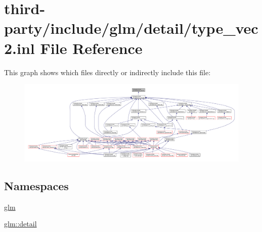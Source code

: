 \hypertarget{type__vec2_8inl}{}\section{third-\/party/include/glm/detail/type\+\_\+vec2.inl File Reference}
\label{type__vec2_8inl}
This graph shows which files directly or indirectly include this file\+:
\nopagebreak
\begin{figure}[H]
\begin{center}
\leavevmode
\includegraphics[width=350pt]{type__vec2_8inl__dep__incl}
\end{center}
\end{figure}
\subsection*{Namespaces}
\begin{DoxyCompactItemize}
\item 
 \hyperlink{namespaceglm}{glm}
\item 
 \hyperlink{namespaceglm_1_1detail}{glm\+::detail}
\end{DoxyCompactItemize}
